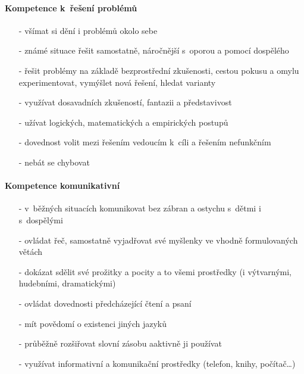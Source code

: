 				\paragraph{Kompetence k řešení problémů}
				\begin{itemize}
				\setlength\itemsep{-2mm}
				\item[-] všímat si dění i problémů okolo sebe
				\item[-] známé situace řešit samostatně, náročnější s oporou a pomocí dospělého
				\item[-] řešit problémy  na základě bezprostřední zkušenosti, cestou pokusu a omylu experimentovat, vymýšlet nová řešení, hledat varianty
				\item[-] využívat dosavadních zkušeností, fantazii a představivost 
				\item[-] užívat logických, matematických a empirických postupů 
				\item[-] dovednost volit mezi řešením vedoucím k cíli a řešením nefunkčním
				\item[-] nebát se chybovat
				\end{itemize}
				

				\paragraph{Kompetence komunikativní}
				\begin{itemize}
				\setlength\itemsep{-2mm}
				\item[-] v běžných situacích komunikovat bez zábran a ostychu s dětmi i s dospělými
				\item[-] ovládat řeč, samostatně vyjadřovat své myšlenky ve vhodně formulovaných větách
				\item[-] dokázat sdělit své prožitky a pocity a to všemi prostředky (i výtvarnými, hudebními, dramatickými) 
				\item[-] ovládat dovednosti předcházející čtení a psaní 
				\item[-] mít povědomí o existenci jiných jazyků
				\item[-] průběžně rozšiřovat slovní zásobu aaktivně ji používat
				\item[-] využívat informativní a komunikační prostředky (telefon, knihy, počítač…)
				\end{itemize}

